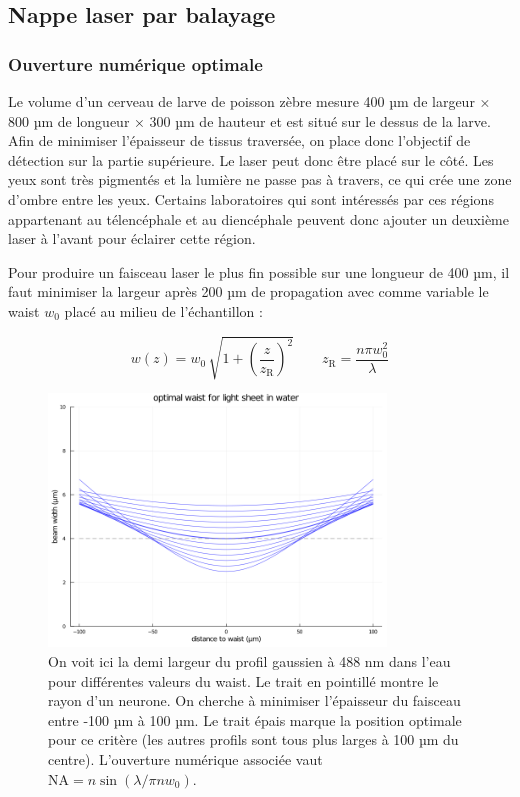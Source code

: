 \subsection{Nappe laser par balayage}

\subsubsection{Ouverture numérique optimale}

Le volume d'un cerveau de larve de poisson zèbre mesure 400 µm de largeur × 800 µm de longueur × 300 µm de hauteur et est situé sur le dessus de la larve. Afin de minimiser l'épaisseur de tissus traversée, on place donc l'objectif de détection sur la partie supérieure. Le laser peut donc être placé sur le côté. Les yeux sont très pigmentés et la lumière ne passe pas à travers, ce qui crée une zone d'ombre entre les yeux. Certains laboratoires qui sont intéressés par ces régions appartenant au télencéphale et au diencéphale peuvent donc ajouter un deuxième laser à l'avant pour éclairer cette région.

Pour produire un faisceau laser le plus fin possible sur une longueur de 400 µm, il faut minimiser la largeur après 200 µm de propagation avec comme variable le waist $w_0$ placé au milieu de l'échantillon :

$$
w(z) = w_0 \, \sqrt{ 1+ {\left( \frac{z}{z_\mathrm{R}} \right)}^2 } \qquad z_\mathrm{R} = \frac{n \pi w_0^2 }{\lambda}
$$

\begin{figure}
\centering
\includegraphics[width=0.8\textwidth]{./files/possible-waist_1P.png}
\caption{On voit ici la demi largeur du profil gaussien à 488 nm dans l'eau pour différentes valeurs du waist. Le trait en pointillé montre le rayon d'un neurone. On cherche à minimiser l'épaisseur du faisceau entre -100 µm à 100 µm. Le trait épais marque la position optimale pour ce critère (les autres profils sont tous plus larges à 100 µm du centre). L'ouverture numérique associée vaut $ \mathrm{NA} = n\sin(\lambda/\pi n w_0) $.}
\end{figure}

